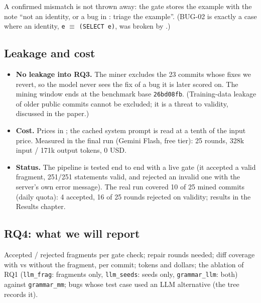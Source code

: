 A confirmed mismatch is not thrown away: the gate stores the example with the
note ``not an identity, or a bug in \pg: triage the example''. (BUG-02 is
exactly a case where an identity, \texttt{e} $\equiv$ \texttt{(SELECT e)}, was
broken by \pg.)

\subsection{Leakage and cost}

\begin{itemize}
  \item \textbf{No leakage into RQ3.} The miner excludes the 23 commits whose
    fixes we revert, so the model never sees the fix of a bug it is later
    scored on. The mining window ends at the benchmark base \texttt{26bd08fb}.
    (Training-data leakage of older public commits cannot be excluded; it is
    a threat to validity, discussed in the paper.)
  \item \textbf{Cost.} Prices in ; the cached system prompt is
    read at a tenth of the input price. Measured in the final run (Gemini
    Flash, free tier): 25 rounds, 328k input / 171k output tokens, 0 USD.
  \item \textbf{Status.} The pipeline is tested end to end with a live gate
    (it accepted a valid fragment, 251/251 statements valid, and rejected an
    invalid one with the server's own error message). The real run covered 10 of
    25 mined commits (daily quota): 4 accepted, 16 of 25 rounds rejected on
    validity; results in the Results chapter.
\end{itemize}

\subsection{RQ4: what we will report}
Accepted / rejected fragments per gate check; repair rounds needed; diff
coverage with vs without the fragment, per commit; tokens and dollars; the
ablation of RQ1 (\texttt{llm\_frag}: fragments only, \texttt{llm\_seeds}: seeds
only, \texttt{grammar\_llm}: both) against \texttt{grammar\_mm}; bugs whose
test case used an LLM alternative (the tree records it).
